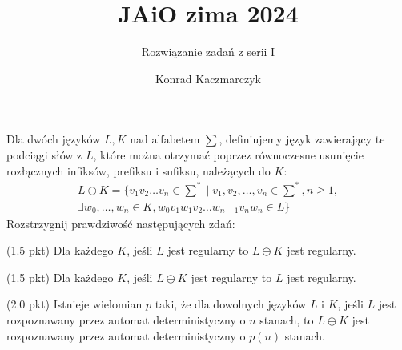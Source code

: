\documentclass[11pt]{scrartcl}
\author{Konrad Kaczmarczyk}
\begin{document}
  \title{JAiO zima 2024}
  \subtitle{Rozwiązanie zadań z serii I}
  \maketitle
    \begin{zadanie}
        Dla dwóch języków $L, K$ nad alfabetem $\sum$, definiujemy język zawierający te podciągi słów z $L$, które można otrzymać poprzez równoczesne usunięcie rozłącznych infiksów, prefiksu i sufiksu, należących do $K$:
        \begin{gather*}
          L \ominus K = \{ v_1 v_2 \dots v_n \in \sum^* \mid v_{1}, v_{2}, \dots, v_n \in \sum^*, n \geq 1, \\
          \exists w_{0}, \dots , w_n \in K, w_0 v_{1} w_{1} v_{2} \dots  w_{n-1} v_n w_n \in L \}
        \end{gather*}
        Rozstrzygnij prawdziwość następujących zdań:
          \begin{walk}
              \item (1.5 pkt) Dla każdego $K$, jeśli $L$ jest regularny to $L \ominus K$ jest regularny.
              \item (1.5 pkt) Dla każdego $K$, jeśli $L \ominus K$ jest regularny to $L$ jest regularny.
              \item (2.0 pkt) Istnieje wielomian $p$ taki, że dla dowolnych języków $L$ i $K$, jeśli $L$ jest rozpoznawany przez automat deterministyczny o $n$ stanach, to $L \ominus K$ jest rozpoznawany przez automat deterministyczny o $p(n)$ stanach.
          \end{walk}
          
    \end{zadanie}
\end{document}
